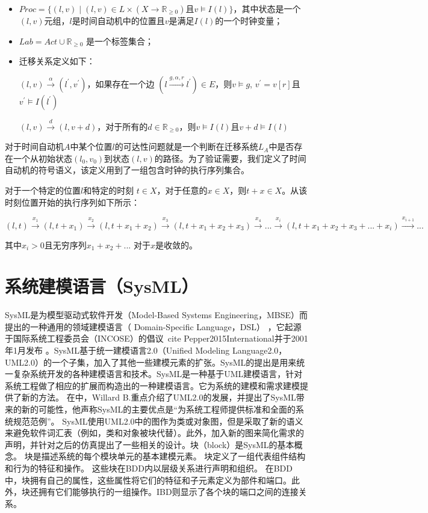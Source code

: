 \begin{itemize}
\item 
$Proc = \lbrace(l,v) \mid (l,v) \in L \times (X \rightarrow \mathbb{R}_{\geqslant{0}})$且$v \models I(l) \rbrace$，其中状态是一个$(l,v)$元组，$l$是时间自动机中的位置且$v$是满足$I(l)$的一个时钟变量；
\item
$Lab = Act \cup \mathbb{R}_{\geqslant{0}}$ 是一个标签集合；
\item
迁移关系定义如下：

$(l,v) \xrightarrow{\alpha} (l^{\prime},v^{\prime})$，如果存在一个边 $(l \xrightarrow{g,\alpha,r} l^{\prime}) \in E$，则$v \models g$, $v^{\prime} = v[r]$且$v^{\prime} \models I(l^{\prime})$

$(l,v) \xrightarrow{d} (l,v+d)$，对于所有的$d \in  \mathbb{R}_{\geqslant{0}}$，则$v \models I(l)$且$v + d \models I(l)$
\end{itemize}
对于时间自动机$A$中某个位置$l$的可达性问题就是一个判断在迁移系统$L_{A}$中是否存在一个从初始状态$(l_{0},v_{0})$到状态$(l,v)$的路径。为了验证需要，我们定义了时间自动机的符号语义，该定义用到了一组包含时钟的执行序列集合。

对于一个特定的位置$l$和特定的时刻 $t \in X$，对于任意的$x \in X$，则$t + x \in X$。从该时刻位置开始的执行序列如下所示：

$(l,t) \xrightarrow{x_{1}} (l,t+x_{1}) \xrightarrow{x_{2}} (l,t+x_{1}+x_{2}) \xrightarrow{x_{3}} (l,t+x_{1}+x_{2}+x_{3}) \xrightarrow{x_{4}}...\xrightarrow{x_{i}}(l,t+x_{1}+x_{2}+x_{3}+...+x_{i}) \xrightarrow{x_{i+1}}...$

其中$x_{i} > 0$且无穷序列$x_{1} + x_{2} + . . .$ 对于$x$是收敛的。 
\section{系统建模语言（SysML）}
SysML是为模型驱动式软件开发（Model-Based Systems Engineering，MBSE）\cite{Dori16}而提出的一种通用的领域建模语言（ Domain-Specific Language，DSL）\cite{SemerathBHSV17} ，它起源于国际系统工程委员会（INCOSE）的倡议\ cite {Pepper2015International}并于2001年1月发布 。SysML基于统一建模语言2.0（Unified Modeling Language2.0，UML2.0）\cite{Bjerkander2003Architecting}的一个子集，加入了其他一些建模元素的扩张。SysML的提出是用来统一复杂系统开发的各种建模语言和技术。SysML是一种基于UML建模语言，针对系统工程做了相应的扩展而构造出的一种建模语言。它为系统的建模和需求建模提供了新的方法。 在\cite{Bjerkander2003Architecting}中，Willard B.重点介绍了UML2.0的发展，并提出了SysML带来的新的可能性，他声称SysML的主要优点是“为系统工程师提供标准和全面的系统规范范例”。 SysML使用UML2.0中的图作为类或对象图，但是采取了新的语义来避免软件词汇表（例如，类和对象被块代替）。此外，加入新的图来简化需求的声明，并针对之后的仿真提出了一些相关的设计。块（block）是SysML的基本概念。 块是描述系统的每个模块单元的基本建模元素。 块定义了一组代表组件结构和行为的特征和操作。 这些块在BDD内以层级关系进行声明和组织。 在BDD中，块拥有自己的属性，这些属性将它们的特征和子元素定义为部件和端口。此外，块还拥有它们能够执行的一组操作。IBD则显示了各个块的端口之间的连接关系。

